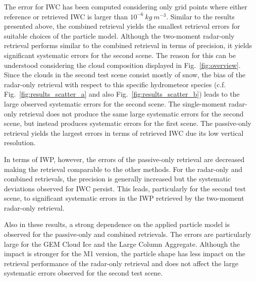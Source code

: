 \documentclass[journal abbreviation, manuscript]{copernicus}
\begin{document}
The error for IWC has been computed considering only grid points where either
reference or retrieved IWC is larger than $10^{-6}\ \unit{kg\ m^{-3}}$. Similar
to the results presented above, the combined retrieval yields the smallest
retrieval errors for suitable choices of the particle model. Although the
two-moment radar-only retrieval performs similar to the combined retrieval in
terms of precision, it yields significant systematic errors for the second
scene. The reason for this can be understood considering the cloud composition
displayed in Fig.~\ref{fig:overview}. Since the clouds in the second test scene
consist mostly of snow, the bias of the radar-only retrieval with respect to
this specific hydrometeor species (c.f. Fig.~\ref{fig:results_scatter_a} and
also Fig.~\ref{fig:results_scatter_b}) leads to the large observed systematic
errors for the second scene. The single-moment radar-only retrieval does not
produce the same large systematic errors for the second scene, but instead
produces systematic errors for the first scene. The passive-only retrieval
yields the largest errors in terms of retrieved IWC due its low vertical
resolution.

In terms of IWP, however, the errors of the passive-only retrieval are decreased
making the retrieval comparable to the other methods. For the radar-only
and combined retrievals, the precision is generally increased but the systematic
deviations observed for IWC persist. This leads, particularly for the second
test scene, to significant systematic errors in the IWP retrieved by the
two-moment radar-only retrieval.

Also in these results, a strong dependence on the applied particle model is
observed for the passive-only and combined retrievals. The errors are
particularly large for the GEM Cloud Ice and the Large Column Aggregate.
Although the impact is stronger for the M1 version, the particle shape has less
impact on the retrieval performance of the radar-only retrieval and does not
affect the large systematic errors observed for the second test scene.
\end{document}
